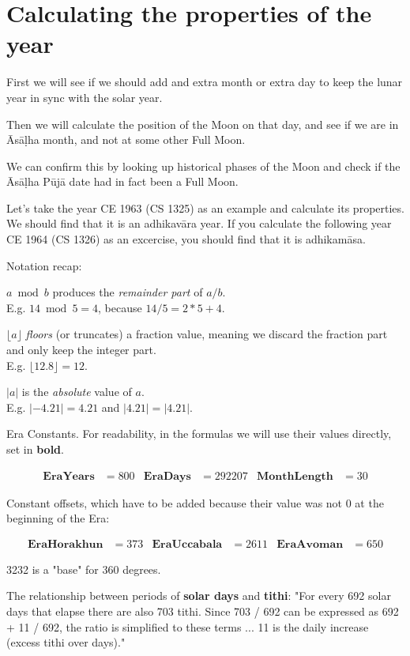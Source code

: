 \documentclass[11pt,oneside]{memoir-article}
\begin{document}
\section{Calculating the properties of the year}
\label{sec-4-2}

First we will see if we should add and extra month or extra day to keep the
lunar year in sync with the solar year.

Then we will calculate the position of the Moon on that day, and see if we are
in Āsāḷha month, and not at some other Full Moon.

We can confirm this by looking up historical phases of the Moon and check if the
Āsāḷha Pūjā date had in fact been a Full Moon.

Let's take the year CE 1963 (CS 1325) as an example and calculate its
properties. We should find that it is an adhikavāra year. If you calculate the
following year CE 1964 (CS 1326) as an excercise, you should find that it is
adhikamāsa.

Notation recap:

$a \bmod b$ produces the \emph{remainder part} of $a/b$.\\
E.g. $14 \bmod 5 = 4$, because $14/5 = 2*5 + 4$.

$\lfloor a \rfloor$ \emph{floors} (or truncates) a fraction value, meaning we discard
the fraction part and only keep the integer part.\\
E.g. $\lfloor 12.8 \rfloor = 12$.

$|a|$ is the \emph{absolute} value of $a$.\\
E.g. $|-4.21| = 4.21$ and $|4.21| = |4.21|$.


Era Constants. For readability, in the formulas we will use their values directly, set in \textbf{bold}.

\begin{align*}
  \mathbf{EraYears} & = 800 & \mathbf{EraDays} & = 292207 & \mathbf{MonthLength} & = 30
\end{align*}

Constant offsets, which have to be added because their value was not 0 at the beginning of the Era:

\begin{align*}
  \mathbf{EraHorakhun} & = 373 & \mathbf{EraUccabala} & = 2611 & \mathbf{EraAvoman} & = 650 
\end{align*}

3232 is a "base" for 360 degrees.\autocite[p. 48]{eade1995calendrical}

The relationship between periods of \textbf{solar days} and \textbf{tithi}:
"For every 692 solar days that elapse there are also 703 tithi.
Since 703 / 692 can be expressed as 692 + 11 / 692, the ratio is simplified to these terms ...
11 is the daily increase (excess tithi over days)."\autocite[p. 48]{eade1995calendrical}
\end{document}
